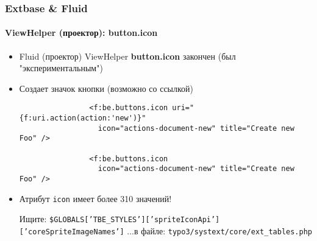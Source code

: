 \begin{frame}[fragile]
	\frametitle{Extbase \& Fluid}
	\framesubtitle{ViewHelper (проектор): button.icon}

	\lstset{
		basicstyle=\smaller\ttfamily
	}

	\begin{itemize}
		\item Fluid (проектор) ViewHelper \textbf{button.icon} закончен (был "экспериментальным")
		\item Создает значок кнопки (возможно со ссылкой)

			\begin{lstlisting}
				<f:be.buttons.icon uri="{f:uri.action(action:'new')}"
				  icon="actions-document-new" title="Create new Foo" />

				<f:be.buttons.icon
				  icon="actions-document-new" title="Create new Foo" />
			\end{lstlisting}

		\item Атрибут \texttt{icon} имеет более 310 значений!\newline

			\smaller
				Ищите:\newline
				\texttt{\$GLOBALS['TBE\_STYLES']['spriteIconApi']['coreSpriteImageNames']}\newline
				...в файле:\newline
				\texttt{typo3/systext/core/ext\_tables.php}
			\normalsize

	\end{itemize}

\end{frame}


